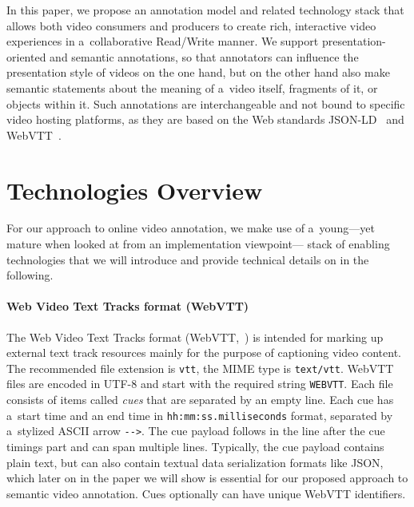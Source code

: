 \documentclass{sig-alternate}
\def\JSONLD{\mbox{JSON-LD}}
\begin{document}
In this paper, we propose an annotation model
and related technology stack that allows both
video consumers and producers to create
rich, interactive video experiences
in a~collaborative Read/Write manner.
We support presentation-oriented and semantic annotations,
so that annotators can influence
the presentation style of videos on the one hand,
but on the other hand also make semantic statements
about the meaning of a~video itself, fragments of it,
or objects within it.
Such annotations are interchangeable
and not bound to specific video hosting platforms,
as they are based on the Web standards
\JSONLD~\cite{sporny2013jsonld}
and WebVTT~\cite{pfeiffer2013webvtt}.

\section{Technologies Overview}

For our approach to online video annotation,
we make use of a~young---yet mature
when looked at from an implementation viewpoint---%
stack of enabling technologies that we will introduce
and provide technical details on in the following.

\paragraph{Web Video Text Tracks format (WebVTT)}

The Web Video Text Tracks format (WebVTT,~\cite{pfeiffer2013webvtt})
is intended for marking up external text track resources mainly
for the purpose of captioning video content.
The recommended file extension is \texttt{vtt},
the MIME type is \texttt{text/vtt}.
WebVTT files are encoded in UTF-8 and
start with the required string \texttt{WEBVTT}.
Each file consists of items called \emph{cues}
that are separated by an empty line.
Each cue has a~start time and an end time in
\texttt{hh:mm:ss.milliseconds} format,
separated by a~stylized ASCII arrow \texttt{-}\texttt{->}.
The cue payload follows in the line after the cue timings part
and can span multiple lines.
Typically, the cue payload contains plain text,
but can also contain textual data serialization formats like JSON,
which later on in the paper we will show is essential
for our proposed approach to semantic video annotation.
Cues optionally can have unique WebVTT identifiers.
\end{document}

